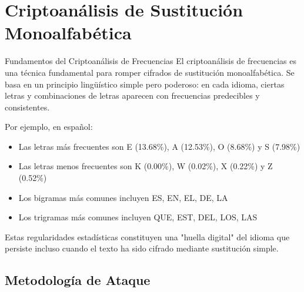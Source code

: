 \section{Criptoanálisis de Sustitución Monoalfabética}

\begin{cryptoanalysis}{Fundamentos del Criptoanálisis de Frecuencias}
El criptoanálisis de frecuencias es una técnica fundamental para romper cifrados de sustitución monoalfabética. Se basa en un principio lingüístico simple pero poderoso: en cada idioma, ciertas letras y combinaciones de letras aparecen con frecuencias predecibles y consistentes.

Por ejemplo, en español:
\begin{itemize}
    \item Las letras más frecuentes son E (13.68\%), A (12.53\%), O (8.68\%) y S (7.98\%)
    \item Las letras menos frecuentes son K (0.00\%), W (0.02\%), X (0.22\%) y Z (0.52\%)
    \item Los bigramas más comunes incluyen ES, EN, EL, DE, LA
    \item Los trigramas más comunes incluyen QUE, EST, DEL, LOS, LAS
\end{itemize}

Estas regularidades estadísticas constituyen una "huella digital" del idioma que persiste incluso cuando el texto ha sido cifrado mediante sustitución simple.
\end{cryptoanalysis}

\subsection{Metodología de Ataque}


